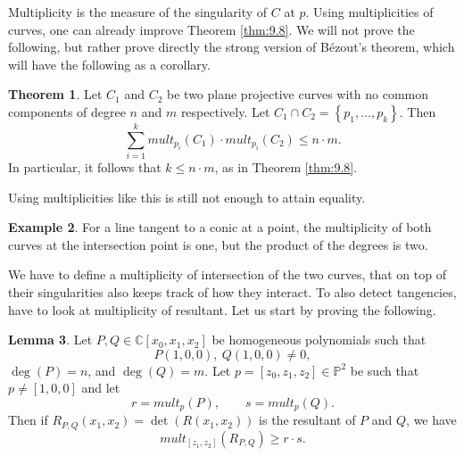 \documentclass{article}
\newcommand{\C}{\mathbb{C}}
\renewcommand{\P}{\mathbb{P}}
\newcommand{\rb}[1]{\left( #1 \right)}
\renewcommand{\sb}[1]{\left[ #1 \right]}
\newcommand{\cb}[1]{\left\{ #1 \right\}}
\theoremstyle{definition}\newtheorem{definition}{Definition}[section]
\theoremstyle{definition}\newtheorem{notation}[definition]{Notation}
\theoremstyle{definition}\newtheorem{remark}[definition]{Remark}
\theoremstyle{definition}\newtheorem{example}[definition]{Example}
\theoremstyle{definition}\newtheorem{fact}{Fact}
\theoremstyle{definition}\newtheorem{exercise}{Exercise}
\newtheorem{lemma}[definition]{Lemma}
\newtheorem{theorem}[definition]{Theorem}
\begin{document}

Multiplicity is the measure of the singularity of $ C $ at $ p $. Using multiplicities of curves, one can already improve Theorem \ref{thm:9.8}. We will not prove the following, but rather prove directly the strong version of Bézout's theorem, which will have the following as a corollary.

\begin{theorem}
\label{thm:11.6}
Let $ C_1 $ and $ C_2 $ be two plane projective curves with no common components of degree $ n $ and $ m $ respectively. Let $ C_1 \cap C_2 = \cb{p_1, \dots, p_k} $. Then
$$ \sum_{i = 1}^k mult_{p_i}\rb{C_1} \cdot mult_{p_i}\rb{C_2} \le n \cdot m. $$
In particular, it follows that $ k \le n \cdot m $, as in Theorem \ref{thm:9.8}.
\end{theorem}

Using multiplicities like this is still not enough to attain equality.

\begin{example}
For a line tangent to a conic at a point, the multiplicity of both curves at the intersection point is one, but the product of the degrees is two.
\end{example}

We have to define a multiplicity of intersection of the two curves, that on top of their singularities also keeps track of how they interact. To also detect tangencies, have to look at multiplicity of resultant. Let us start by proving the following.

\begin{lemma}
\label{lem:11.7}
Let $ P, Q \in \C\sb{x_0, x_1, x_2} $ be homogeneous polynomials such that
$$ P\rb{1, 0, 0}, \ Q\rb{1, 0, 0} \ne 0, $$
$ \deg\rb{P} = n $, and $ \deg\rb{Q} = m $. Let $ p = \sb{z_0, z_1, z_2} \in \P^2 $ be such that $ p \ne \sb{1, 0, 0} $ and let
$$ r = mult_p\rb{P}, \qquad s = mult_p\rb{Q}. $$
Then if $ R_{P, Q}\rb{x_1, x_2} = \det\rb{R\rb{x_1, x_2}} $ is the resultant of $ P $ and $ Q $, we have
$$ mult_{\sb{z_1, z_2}}\rb{R_{P, Q}} \ge r \cdot s. $$
\end{lemma}
\end{document}
